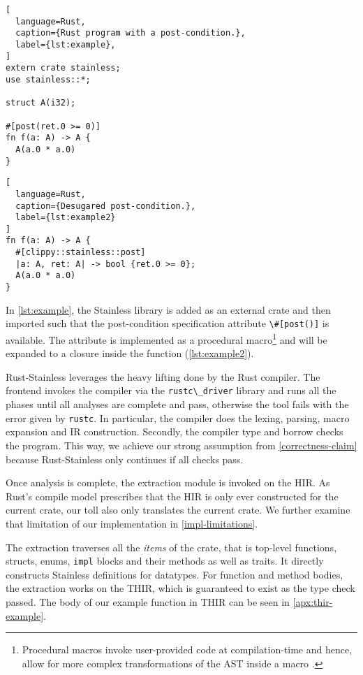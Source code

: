 \noindent\begin{minipage}[b]{.45\textwidth}
\begin{lstlisting}[
  language=Rust,
  caption={Rust program with a post-condition.},
  label={lst:example},
]
extern crate stainless;
use stainless::*;

struct A(i32);

#[post(ret.0 >= 0)]
fn f(a: A) -> A {
  A(a.0 * a.0)
}
\end{lstlisting}
\end{minipage}\hfill
\begin{minipage}[b]{.52\textwidth}
\begin{lstlisting}[
  language=Rust,
  caption={Desugared post-condition.},
  label={lst:example2}
]
fn f(a: A) -> A {
  #[clippy::stainless::post]
  |a: A, ret: A| -> bool {ret.0 >= 0};
  A(a.0 * a.0)
}
\end{lstlisting}
\end{minipage}

In \autoref{lst:example}, the Stainless library is added as an external crate
and then imported such that the post-condition specification attribute
\passthrough{\lstinline!\#[post()]!} is available. The attribute is implemented
as a procedural macro\footnote{Procedural macros invoke user-provided code at
compilation-time and hence, allow for more complex transformations of the AST
inside a macro \cite[section "Procedural Macros"]{rustref}.} and will be
expanded to a closure inside the function (\autoref{lst:example2}).

Rust-Stainless leverages the heavy lifting done by the Rust compiler. The
frontend invokes the compiler via the \passthrough{\lstinline!rustc\_driver!}
library and runs all the phases until all analyses are complete and pass,
otherwise the tool fails with the error given by
\passthrough{\lstinline!rustc!}. In particular, the compiler does the lexing,
parsing, macro expansion and IR construction. Secondly, the compiler type and
borrow checks the program. This way, we achieve our strong assumption from
\autoref{correctness-claim} because Rust-Stainless only continues if all checks
pass.

Once analysis is complete, the extraction module is invoked on the HIR.
As Rust's compile model prescribes that the HIR is only ever constructed
for the current crate, our toll also only translates the current crate.
We further examine that limitation of our implementation in \autoref{impl-limitations}.

The extraction traverses all the \emph{items} of the crate, that is top-level
functions, structs, enums, \passthrough{\lstinline!impl!} blocks and their
methods as well as traits. It directly constructs Stainless definitions for
datatypes. For function and method bodies, the extraction works on the THIR,
which is guaranteed to exist as the type check passed. The body of our example
function in THIR can be seen in \autoref{apx:thir-example}.

